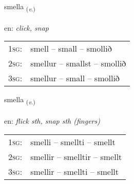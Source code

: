 \documentclass[frontgrid, backgrid]{flacards}\usepackage[]{graphicx}\usepackage[]{xcolor}
\begin{document}
\renewcommand{\flhead}{\vskip5pt \fboxsep=0pt {\small\bfseries\footnotesize Sagnorð | Verb}}
\renewcommand{\fcfoot}{\vskip5pt \fboxsep=0pt \hspace{2pt}{\small\bfseries\footnotesize 3K}}

\renewcommand{\blhead}{\vskip5pt {\small\bfseries\footnotesize Sagnorð | Verb }}
\renewcommand{\bcfoot}{\vskip5pt \hspace{2pt}{\small\bfseries\footnotesize 3K}}


{smella \small{\textsubscript{(\textit{v.})}} \\[1ex] %
\textphonetic{[smɛtla]} \\
en: \emph{click, snap} \\  [2ex]
\renewcommand*{\arraystretch}{0.8}
\begin{tabular}{p{1cm}l}
\textsc{1sg}: & smell -- small -- smollið \\ 
\textsc{2sg}: & smellur -- smallst -- smollið \\ 
\textsc{3sg}: & smellur -- small -- smollið \\ 
\end{tabular}
}

\renewcommand{\flhead}{\vskip5pt \fboxsep=0pt {\small\bfseries\footnotesize Sagnorð | Verb}}
\renewcommand{\fcfoot}{\vskip5pt \fboxsep=0pt \hspace{2pt}{\small\bfseries\footnotesize 3K}}

\renewcommand{\blhead}{\vskip5pt {\small\bfseries\footnotesize Sagnorð | Verb }}
\renewcommand{\bcfoot}{\vskip5pt \hspace{2pt}{\small\bfseries\footnotesize 3K}}


{smella \small{\textsubscript{(\textit{v.})}} \\[1ex] %
\textphonetic{[smɛtla]} \\
en: \emph{flick sth, snap sth (fingers)} \\  [2ex]
\renewcommand*{\arraystretch}{0.8}
\begin{tabular}{p{1cm}l}
\textsc{1sg}: & smelli -- smellti -- smellt \\ 
\textsc{2sg}: & smellir -- smelltir -- smellt \\ 
\textsc{3sg}: & smellir -- smellti -- smellt \\ 
\end{tabular}
}
\end{document}
